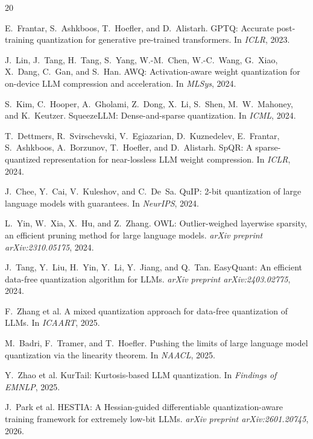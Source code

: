 \documentclass{article}
\begin{document}
\begin{thebibliography}{20}

E.~Frantar, S.~Ashkboos, T.~Hoefler, and D.~Alistarh.
\newblock GPTQ: Accurate post-training quantization for generative pre-trained transformers.
\newblock In \emph{ICLR}, 2023.

J.~Lin, J.~Tang, H.~Tang, S.~Yang, W.-M.~Chen, W.-C.~Wang, G.~Xiao, X.~Dang, C.~Gan, and S.~Han.
\newblock AWQ: Activation-aware weight quantization for on-device LLM compression and acceleration.
\newblock In \emph{MLSys}, 2024.

S.~Kim, C.~Hooper, A.~Gholami, Z.~Dong, X.~Li, S.~Shen, M.~W.~Mahoney, and K.~Keutzer.
\newblock SqueezeLLM: Dense-and-sparse quantization.
\newblock In \emph{ICML}, 2024.

T.~Dettmers, R.~Svirschevski, V.~Egiazarian, D.~Kuznedelev, E.~Frantar, S.~Ashkboos, A.~Borzunov, T.~Hoefler, and D.~Alistarh.
\newblock SpQR: A sparse-quantized representation for near-lossless LLM weight compression.
\newblock In \emph{ICLR}, 2024.

J.~Chee, Y.~Cai, V.~Kuleshov, and C.~De~Sa.
\newblock QuIP: 2-bit quantization of large language models with guarantees.
\newblock In \emph{NeurIPS}, 2024.

L.~Yin, W.~Xia, X.~Hu, and Z.~Zhang.
\newblock OWL: Outlier-weighed layerwise sparsity, an efficient pruning method for large language models.
\newblock \emph{arXiv preprint arXiv:2310.05175}, 2024.

J.~Tang, Y.~Liu, H.~Yin, Y.~Li, Y.~Jiang, and Q.~Tan.
\newblock EasyQuant: An efficient data-free quantization algorithm for LLMs.
\newblock \emph{arXiv preprint arXiv:2403.02775}, 2024.

F.~Zhang et al.
\newblock A mixed quantization approach for data-free quantization of LLMs.
\newblock In \emph{ICAART}, 2025.

M.~Badri, F.~Tramer, and T.~Hoefler.
\newblock Pushing the limits of large language model quantization via the linearity theorem.
\newblock In \emph{NAACL}, 2025.

Y.~Zhao et al.
\newblock KurTail: Kurtosis-based LLM quantization.
\newblock In \emph{Findings of EMNLP}, 2025.

J.~Park et al.
\newblock HESTIA: A Hessian-guided differentiable quantization-aware training framework for extremely low-bit LLMs.
\newblock \emph{arXiv preprint arXiv:2601.20745}, 2026.


\end{thebibliography}
\end{document}
